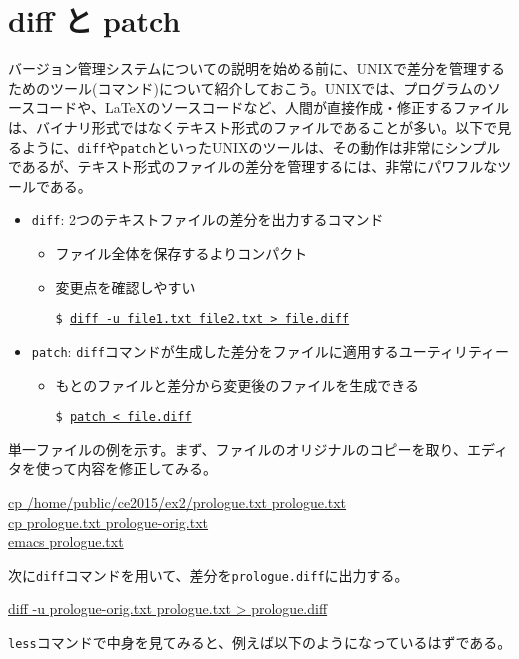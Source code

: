 \section{diff と patch}

バージョン管理システムについての説明を始める前に、UNIXで差分を管理するためのツール(コマンド)について紹介しておこう。UNIXでは、プログラムのソースコードや、\LaTeX のソースコードなど、人間が直接作成・修正するファイルは、バイナリ形式ではなくテキスト形式のファイルであることが多い。以下で見るように、{\tt diff}や{\tt patch}といったUNIXのツールは、その動作は非常にシンプルであるが、テキスト形式のファイルの差分を管理するには、非常にパワフルなツールである。

\begin{itemize}
\item {\tt diff}: 2つのテキストファイルの差分を出力するコマンド
  \begin{itemize}
  \item ファイル全体を保存するよりコンパクト
  \item 変更点を確認しやすい
    
    {\tt \$ \underline{diff -u file1.txt file2.txt > file.diff}}
  \end{itemize}
\item {\tt patch}: {\tt diff}コマンドが生成した差分をファイルに適用するユーティリティー
  \begin{itemize}
  \item もとのファイルと差分から変更後のファイルを生成できる
    
    {\tt \$ \underline{patch < file.diff}}
  \end{itemize}
\end{itemize}
単一ファイルの例を示す。まず、ファイルのオリジナルのコピーを取り、エディタを使って内容を修正してみる。
\begin{commandline2}
  \prompt \underline{cp /home/public/ce2015/ex2/prologue.txt prologue.txt} \\
  \prompt \underline{cp prologue.txt prologue-orig.txt} \\
  \prompt \underline{emacs prologue.txt}
\end{commandline2} \noindent
次に{\tt diff}コマンドを用いて、差分を{\tt prologue.diff}に出力する。
\begin{commandline2}
  \prompt \underline{diff -u prologue-orig.txt prologue.txt > prologue.diff}
\end{commandline2} \noindent
{\tt less}コマンドで中身を見てみると、例えば以下のようになっているはずである。
